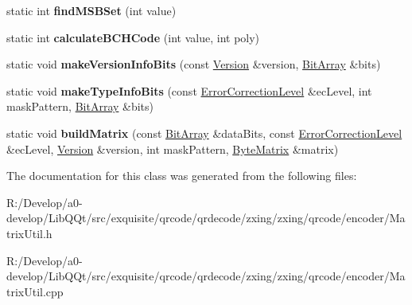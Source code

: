 \begin{DoxyCompactItemize}
\item 
\mbox{\label{classzxing_1_1qrcode_1_1_matrix_util_ad28ef0c757e1f47ad471d0b873b2edf9}} 
static int {\bfseries find\+M\+S\+B\+Set} (int value)
\item 
\mbox{\label{classzxing_1_1qrcode_1_1_matrix_util_afdb4edf362dea481bf3fa0e6d6dcc1b4}} 
static int {\bfseries calculate\+B\+C\+H\+Code} (int value, int poly)
\item 
\mbox{\label{classzxing_1_1qrcode_1_1_matrix_util_a06084baa7d78b2ea1d1d673b9dde36de}} 
static void {\bfseries make\+Version\+Info\+Bits} (const \mbox{\hyperlink{classzxing_1_1qrcode_1_1_version}{Version}} \&version, \mbox{\hyperlink{classzxing_1_1_bit_array}{Bit\+Array}} \&bits)
\item 
\mbox{\label{classzxing_1_1qrcode_1_1_matrix_util_aaf1d48884017c13b3cc6c7790936ef31}} 
static void {\bfseries make\+Type\+Info\+Bits} (const \mbox{\hyperlink{classzxing_1_1qrcode_1_1_error_correction_level}{Error\+Correction\+Level}} \&ec\+Level, int mask\+Pattern, \mbox{\hyperlink{classzxing_1_1_bit_array}{Bit\+Array}} \&bits)
\item 
\mbox{\label{classzxing_1_1qrcode_1_1_matrix_util_a07db60e232671c1618e2de5ceb5dbf8e}} 
static void {\bfseries build\+Matrix} (const \mbox{\hyperlink{classzxing_1_1_bit_array}{Bit\+Array}} \&data\+Bits, const \mbox{\hyperlink{classzxing_1_1qrcode_1_1_error_correction_level}{Error\+Correction\+Level}} \&ec\+Level, \mbox{\hyperlink{classzxing_1_1qrcode_1_1_version}{Version}} \&version, int mask\+Pattern, \mbox{\hyperlink{classzxing_1_1qrcode_1_1_byte_matrix}{Byte\+Matrix}} \&matrix)
\end{DoxyCompactItemize}


The documentation for this class was generated from the following files\+:\begin{DoxyCompactItemize}
\item 
R\+:/\+Develop/a0-\/develop/\+Lib\+Q\+Qt/src/exquisite/qrcode/qrdecode/zxing/zxing/qrcode/encoder/Matrix\+Util.\+h\item 
R\+:/\+Develop/a0-\/develop/\+Lib\+Q\+Qt/src/exquisite/qrcode/qrdecode/zxing/zxing/qrcode/encoder/Matrix\+Util.\+cpp\end{DoxyCompactItemize}
